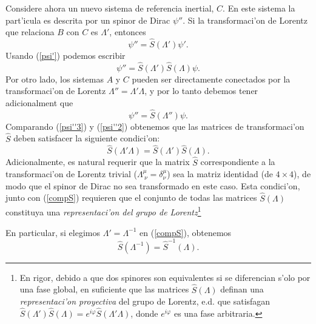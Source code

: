 Considere ahora un nuevo sistema de referencia inertial, $C$. En este sistema
la part'icula es descrita por un spinor de Dirac $\psi''$. Si la
transformaci'on de Lorentz que relaciona $B$ con $C$ es $\Lambda'$, entonces
\begin{equation}
\psi'' =\hat{S}(\Lambda') \psi'. \label{psi''}
\end{equation}
Usando (\ref{psi'}) podemos escribir
\begin{equation}
 \psi'' =\hat{S}(\Lambda') \hat{S}(\Lambda)\psi. \label{psi''2}
\end{equation} 
Por otro lado, los sistemas $A$ y $C$ pueden ser directamente conectados por la
transformaci'on de Lorentz $\Lambda''=\Lambda'\Lambda$, y por lo tanto debemos
tener adicionalment que
\begin{equation}
\psi'' =\hat{S}(\Lambda'') \psi. \label{psi''3}
\end{equation}
Comparando (\ref{psi''3}) y (\ref{psi''2}) obtenemos que las matrices de
transformaci'on $\hat{S}$ deben satisfacer la siguiente condici'on:
\begin{equation}
 \hat{S}(\Lambda'\Lambda)=\hat{S}(\Lambda')\hat{S}(\Lambda). \label{compS}
\end{equation} 
Adicionalmente, es natural requerir que la matrix $\hat{S}$
correspondiente a la transformaci'on de Lorentz trivial ($\Lambda^\mu_{\
\nu}=\delta^\mu_\nu$) sea la matriz identidad (de $4\times 4$), de modo que el
spinor de Dirac no sea transformado en este caso. Esta condici'on, junto con
(\ref{compS}) requieren que el conjunto de todas las matrices $\hat{S}(\Lambda)$
constituya una \textit{representaci'on del grupo de Lorentz}\footnote{En rigor,
debido a que dos spinores son equivalentes si se diferencian s'olo por una fase
global, en suficiente que las matrices $\hat{S}(\Lambda)$ definan una
\textit{representaci'on proyectiva} del grupo de Lorentz, e.d. que satisfagan
$\hat{S}(\Lambda')\hat{S}(\Lambda)=e^{i\varphi}\hat{S}(\Lambda'\Lambda)$, donde
$e^{i\varphi}$ es una fase arbitraria.}

En particular, si elegimos $\Lambda'=\Lambda^{-1}$ en (\ref{compS}), obtenemos
\begin{equation}
\hat{S}(\Lambda^{-1})=\hat{S}^{-1}(\Lambda). \label{Sinv}
\end{equation}

